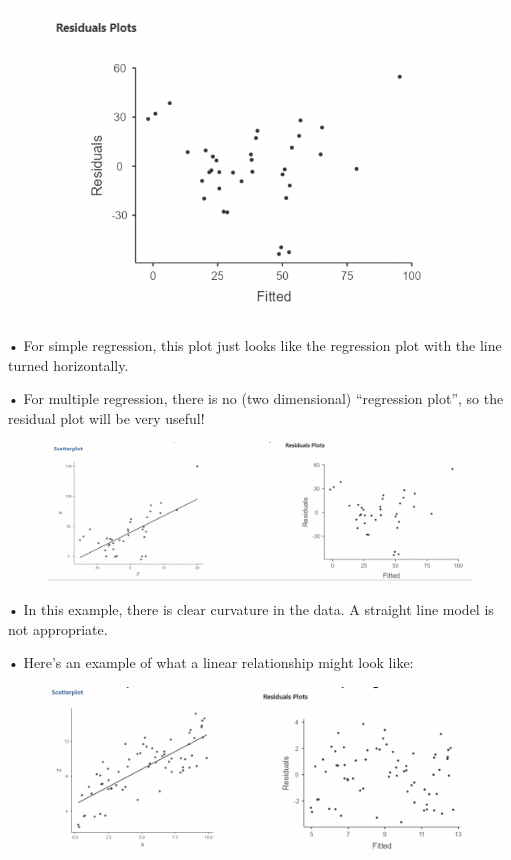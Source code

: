 \documentclass[
  letterpaper,
  DIV=11,
  numbers=noendperiod]{scrreprt}
\begin{document}
\begin{figure}

{\centering \includegraphics[width=3.98958in,height=\textheight]{images/mod4_pt1_2.png}

}

\end{figure}

• For simple regression, this plot just looks like the regression plot
with the line turned horizontally.

• For multiple regression, there is no (two dimensional) ``regression
plot'', so the residual plot will be very useful!

\begin{figure}

{\centering \includegraphics{images/mod4_pt1_3.png}

}

\end{figure}

• In this example, there is clear curvature in the data. A straight line
model is not appropriate.

• Here's an example of what a linear relationship might look like:

\begin{figure}

{\centering \includegraphics{images/mod4_pt1_4.png}

}

\end{figure}
\end{document}
